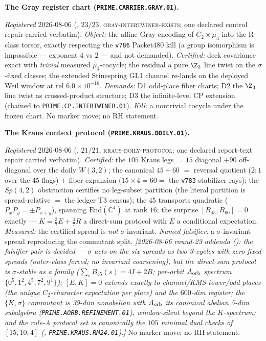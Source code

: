 \par\smallskip\noindent\textbf{The Gray register chart
(\texttt{PRIME.CARRIER.GRAY.01}).}
{\sloppy
\emph{Registered} 2026-08-06
(, $23/23$,
\textsc{gray-intertwiner-exists}; one declared control repair
carried verbatim).  \emph{Object:} the affine Gray encoding of
$C_2\times\mu_4$ into the R-class torsor, exactly respecting the
\texttt{v786} Packet480 kill (a group isomorphism is impossible
--- exponent $4$ vs $2$ --- and not demanded).  \emph{Certified:}
deck covariance exact with \emph{trivial} measured
$\mu_4$-cocycle; the residual a pure $\Z_3$ line twist on the
$\sigma$-fixed classes; the extended Stinespring GL1 channel
re-lands on the deployed Weil window at rel $6.0\times10^{-16}$.
\emph{Demands:} D1 odd-place fiber charts; D2 the $\Z_3$ line
twist as crossed-product structure; D3 the infinite-level CP
extension (chained to \texttt{PRIME.CP.INTERTWINER.01}).
\emph{Kill:} a nontrivial cocycle under the frozen chart.  No
marker move; no RH statement.\par}


\par\smallskip\noindent\textbf{The Kraus context protocol
(\texttt{PRIME.KRAUS.DOILY.01}).}
{\sloppy
\emph{Registered} 2026-08-06
(, $21/21$,
\textsc{kraus-doily-protocol}; one declared report-text repair
carried verbatim).  \emph{Certified:} the $105$ Kraus legs $=15$
diagonal $+90$ off-diagonal over the doily $W(3,2)$; the
canonical $45+60$ $=$ reversal quotient ($2{:}1$ over the $45$
flags) $+$ fiber expansion ($15\times4=60=$ the \texttt{v783}
stabilizer rays); the $Sp(4,2)$ obstruction certifies no
leg-subset partition (the literal partition is spread-relative
$=$ the ledger T3 census); the $45$ transports quadratic
($P_xP_y=\pm P_{x+y}$), spanning $\mathrm{End}(\mathbb C^4)$ at
rank $16$; the surprise $[B_{45},B_{60}]=0$ exactly ---
$K=\tfrac37E+\tfrac47R$ a direct-sum protocol with $E$ a
conditional expectation.  \emph{Measured:} the certified spread
is \emph{not} $\sigma$-invariant.  \emph{Named falsifier:} a
$\sigma$-invariant spread reproducing the commutant split.
\emph{[2026-08-06 round-23 addenda
(): the falsifier pair is
decided --- $\sigma$ acts on the six spreads as two 3-cycles with
\emph{zero} fixed spreads (outer-class forced; no invariant
coarsening), but the direct-sum protocol is $\sigma$-stable as a
\emph{family} ($\sum_sB_{45}(s)=4I+2B$; per-orbit $A_{\rm orb}$
spectrum $\{0^5,1^2,4^5,7^2,9^1\}$); $[E,K]=0$ extends exactly to
channel/KMS-tower/odd places (the unique $C_2$-character
expectation per place) and the $600$-dim register; the
$\{K,\sigma\}$ commutant is 39-dim nonabelian with $A_{\rm orb}$
its canonical abelian 5-dim subalgebra
(\texttt{PRIME.AORB.REFINEMENT.01}), window-silent beyond the
$K$-spectrum; and the rule-A protocol set is canonically the
$105$ minimal dual checks of $[15,10,4]$
(,
\texttt{PRIME.KRAUS.RM24.01}).]}  No
marker move; no RH statement.\par}


